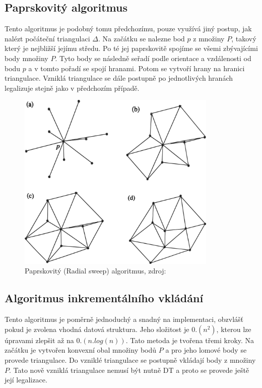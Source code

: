 \documentclass[12pt,a4paper]{article}
\begin{document}
\newpage
\subsection{Paprskovitý algoritmus}

Tento algoritmus je podobný tomu předchozímu, pouze využívá jiný postup, jak nalézt počáteční triangulaci $\Delta$. Na začátku se nalezne bod $p$ z množiny $P$, takový který je nejbližší jejímu středu. Po té jej paprskovitě spojíme se všemi zbývajícími body množiny $P$. Tyto body se následně seřadí podle orientace a vzdálenosti od bodu $p$ a v tomto pořadí se spojí hranami. Potom se vytvoří hrany na hranici triangulace. Vzniklá triangulace se dále postupně po jednotlivých hranách legalizuje stejně jako v předchozím případě.

\begin{figure}[h!]
\centering
\includegraphics[width=0.85\textwidth]{img/rsweep.png}
\caption{Paprskovitý (Radial sweep) algoritmus, zdroj: \cite{triangulation}}
\label{fig:rsweep}
\end{figure}

\newpage
\subsection{Algoritmus inkrementálního vkládání}
\label{subsec:Inc_alg}

Tento algoritmus je poměrně jednoduchý a snadný na implementaci, obzvlášť pokud je zvolena vhodná datová struktura. Jeho složitost je $0.(n^2)$, kterou lze úpravami zlepšit až na $0.(n.log(n))$. Tato metoda je tvořena třemi kroky. Na začátku je vytvořen konvexní obal množiny bodů $P$ a pro jeho lomové body se provede triangulace. Do vzniklé triangulace se postupně vkládají body z množiny $P$. Tato nově vzniklá triangulace nemusí být nutně DT a proto se provede ještě její legalizace.
\end{document}
